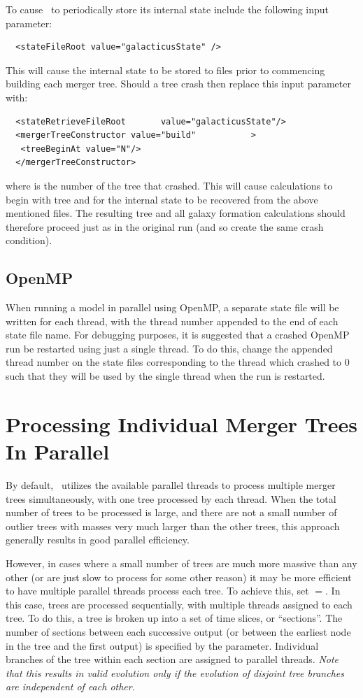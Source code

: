 To cause \glc\ to periodically store its internal state include the following input parameter:
\begin{verbatim}
  <stateFileRoot value="galacticusState" />
\end{verbatim}
This will cause the internal state to be stored to files  prior to commencing building each merger tree. Should a tree crash then replace this input parameter with:
\begin{verbatim}
  <stateRetrieveFileRoot       value="galacticusState"/>
  <mergerTreeConstructor value="build"           >
   <treeBeginAt value="N"/>
  </mergerTreeConstructor>
\end{verbatim}
where  is the number of the tree that crashed. This will cause calculations to begin with tree  and for the internal state to be recovered from the above mentioned files. The resulting tree and all galaxy formation calculations should therefore proceed just as in the original run (and so create the same crash condition).

\subsection{OpenMP}

When running a model in parallel using OpenMP, a separate state file will be written for each thread, with the thread number appended to the end of each state file name. For debugging purposes, it is suggested that a crashed OpenMP run be restarted using just a single thread. To do this, change the appended thread number on the state files corresponding to the thread which crashed to 0 such that they will be used by the single thread when the run is restarted.

\section{Processing Individual Merger Trees In Parallel}

By default, \glc\ utilizes the available parallel threads to process multiple merger trees simultaneously, with one tree processed by each thread. When the total number of trees to be processed is large, and there are not a small number of outlier trees with masses very much larger than the other trees, this approach generally results in good parallel efficiency.

However, in cases where a small number of trees are much more massive than any other (or are just slow to process for some other reason) it may be more efficient to have multiple parallel threads process each tree. To achieve this, set \mono{[treeEvolveSingleForest]}$=$. In this case, trees are processed sequentially, with multiple threads assigned to each tree. To do this, a tree is broken up into a set of time slices, or ``sections''. The number of sections between each successive output (or between the earliest node in the tree and the first output) is specified by the \mono{[treeEvolveSingleForestSections]} parameter. Individual branches of the tree within each section are assigned to parallel threads. \emph{Note that this results in valid evolution only if the evolution of disjoint tree branches are independent of each other.}
